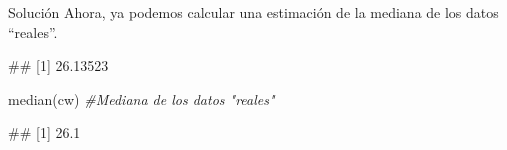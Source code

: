 \documentclass[
  ignorenonframetext,
  aspectratio=169]{beamer}
\newenvironment{Shaded}{\begin{snugshade}}{\end{snugshade}}
\newcommand{\CommentTok}[1]{\textcolor[rgb]{0.56,0.35,0.01}{\textit{#1}}}
\newcommand{\DecValTok}[1]{\textcolor[rgb]{0.00,0.00,0.81}{#1}}
\newcommand{\FunctionTok}[1]{\textcolor[rgb]{0.00,0.00,0.00}{#1}}
\newcommand{\NormalTok}[1]{#1}
\newcommand{\OtherTok}[1]{\textcolor[rgb]{0.56,0.35,0.01}{#1}}
\newcommand{\SpecialCharTok}[1]{\textcolor[rgb]{0.00,0.00,0.00}{#1}}
\let\oldverbatim\verbatim
\let\endoldverbatim\endverbatim
\renewenvironment{verbatim}{\tiny\oldverbatim}{\endoldverbatim}
\begin{document}
\begin{frame}[fragile]{Solución}
\protect\hypertarget{soluciuxf3n-34}{}
Ahora, ya podemos calcular una estimación de la mediana de los datos
``reales''.

\begin{Shaded}
\end{Shaded}

\begin{verbatim}
## [1] 26.13523
\end{verbatim}

\begin{Shaded}
\begin{Highlighting}[]
\FunctionTok{median}\NormalTok{(cw) }\CommentTok{\#Mediana de los datos "reales"}
\end{Highlighting}
\end{Shaded}

\begin{verbatim}
## [1] 26.1
\end{verbatim}
\end{frame}
\end{document}
